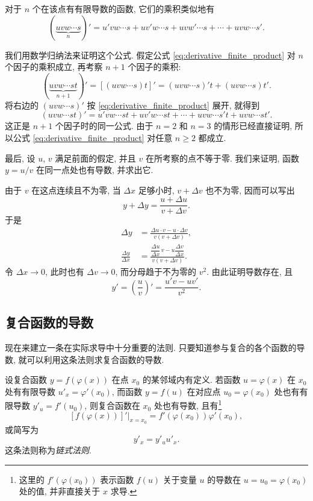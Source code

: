 对于 $n$ 个在该点有有限导数的函数, 它们的乘积类似地有
\begin{equation}\label{eq:derivative_finite_product}
(\underbrace{uvw\cdots s}_{n})'
=u'vw\cdots s+uv'w\cdots s+uvw'\cdots s+\cdots+uvw\cdots s'.
\end{equation}

我们用数学归纳法来证明这个公式.
假定公式 \eqref{eq:derivative_finite_product} 对 $n$ 个因子的乘积成立,
再考察 $n+1$ 个因子的乘积:
$$
(\underbrace{uvw\cdots st}_{n+1})'
=[(uvw\cdots s)t]'
=(uvw\cdots s)'t+(uvw\cdots s)t'.
$$
将右边的 $(uvw\cdots s)'$ 按 \eqref{eq:derivative_finite_product} 展开, 就得到
$$
(uvw\cdots st)'
=u'vw\cdots st+uv'w\cdots st+\cdots+uvw\cdots s't+uvw\cdots st'.
$$
这正是 $n+1$ 个因子时的同一公式.
由于 $n=2$ 和 $n=3$ 的情形已经直接证明, 所以公式
\eqref{eq:derivative_finite_product} 对任意 $n\ge2$ 都成立.

\label{rule:derivative_quotient}
{\kaishu 最后, 设 $u$, $v$ 满足前面的假定, 并且 $v$ 在所考察的点不等于零.
我们来证明, 函数 $y=u/v$ 在同一点处也有导数, 并求出它.}

由于 $v$ 在这点连续且不为零, 当 $\Delta x$ 足够小时,
$v+\Delta v$ 也不为零, 因而可以写出
$$
y+\Delta y=\frac{u+\Delta u}{v+\Delta v}.
$$
于是
\begin{align*}
\Delta y&=\frac{\Delta u\cdot v-u\cdot\Delta v}{v(v+\Delta v)},\\
\frac{\Delta y}{\Delta x}
&=\frac{\dfrac{\Delta u}{\Delta x}\,v-u\dfrac{\Delta v}{\Delta x}}
{v(v+\Delta v)}.
\end{align*}
令 $\Delta x\to0$, 此时也有 $\Delta v\to0$,
而分母趋于不为零的 $v^2$.
由此证明导数存在, 且
$$
y'=\left(\frac{u}{v}\right)'=\frac{u'v-uv'}{v^2}.
$$
\par\endgroup

\subsection{复合函数的导数}\label{subsec:98}
现在来建立一条在实际求导中十分重要的法则.
只要知道参与复合的各个函数的导数, 就可以利用这条法则求复合函数的导数.

\label{rule:derivative_composition}
{\kaishu 设复合函数 $y=f(\varphi(x))$ 在点 $x_0$ 的某邻域内有定义.
若函数 $u=\varphi(x)$ 在 $x_0$ 处有有限导数
$u'_x=\varphi'(x_0)$, 而函数 $y=f(u)$ 在对应点
$u_0=\varphi(x_0)$ 处也有有限导数 $y'_u=f'(u_0)$,
则复合函数在 $x_0$ 处也有导数, 且有\footnote{这里的 $f'(\varphi(x_0))$
表示函数 $f(u)$ 关于变量 $u$ 的导数在 $u=u_0=\varphi(x_0)$ 处的值,
并非直接关于 $x$ 求导.}
$$
\left.[f(\varphi(x))]'\right|_{x=x_0}
=f'(\varphi(x_0))\varphi'(x_0),
$$
或简写为
$$
y'_x=y'_u u'_x.
$$
}
这条法则称为\emph{链式法则}.

